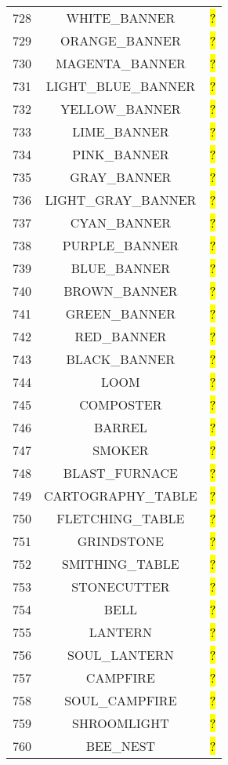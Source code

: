 \documentclass[11pt]{article}
\newcommand\myworries[1]{\sethlcolor{red}\hl{#1}}
\begin{document}
\begin{longtable}{ |c|c|c| }
	728 & WHITE\_BANNER & \myworries{?} \\
	729 & ORANGE\_BANNER & \myworries{?} \\
	730 & MAGENTA\_BANNER & \myworries{?} \\
	731 & LIGHT\_BLUE\_BANNER & \myworries{?} \\
	732 & YELLOW\_BANNER & \myworries{?} \\
	733 & LIME\_BANNER & \myworries{?} \\
	734 & PINK\_BANNER & \myworries{?} \\
	735 & GRAY\_BANNER & \myworries{?} \\
	736 & LIGHT\_GRAY\_BANNER & \myworries{?} \\
	737 & CYAN\_BANNER & \myworries{?} \\
	738 & PURPLE\_BANNER & \myworries{?} \\
	739 & BLUE\_BANNER & \myworries{?} \\
	740 & BROWN\_BANNER & \myworries{?} \\
	741 & GREEN\_BANNER & \myworries{?} \\
	742 & RED\_BANNER & \myworries{?} \\
	743 & BLACK\_BANNER & \myworries{?} \\
	744 & LOOM & \myworries{?} \\
	745 & COMPOSTER & \myworries{?} \\
	746 & BARREL & \myworries{?} \\
	747 & SMOKER & \myworries{?} \\
	748 & BLAST\_FURNACE & \myworries{?} \\
	749 & CARTOGRAPHY\_TABLE & \myworries{?} \\
	750 & FLETCHING\_TABLE & \myworries{?} \\
	751 & GRINDSTONE & \myworries{?} \\
	752 & SMITHING\_TABLE & \myworries{?} \\
	753 & STONECUTTER & \myworries{?} \\
	754 & BELL & \myworries{?} \\
	755 & LANTERN & \myworries{?} \\
	756 & SOUL\_LANTERN & \myworries{?} \\
	757 & CAMPFIRE & \myworries{?} \\
	758 & SOUL\_CAMPFIRE & \myworries{?} \\
	759 & SHROOMLIGHT & \myworries{?} \\
	760 & BEE\_NEST & \myworries{?} \\

\end{longtable}
\end{document}
